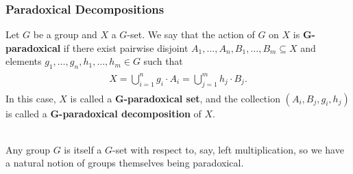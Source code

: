 \documentclass{beamer}
\theoremstyle{example}
\begin{document}
\begin{frame}
\frametitle{Paradoxical Decompositions}
\begin{definition}
Let $G$ be a group and $X$ a $G$-set. We say that the action of $G$ on $X$ is \textbf{$\boldsymbol{G}$-paradoxical} if there exist pairwise disjoint $A_1, \dots, A_n, B_1, \dots, B_m \subseteq X$ and elements $g_1, \dots, g_n, h_1, \dots, h_m \in G$ such that\\[-1.5\baselineskip]
\begin{align*}
\begin{split}
X = \bigcup_{i=1}^n g_i \cdot A_i = \bigcup_{j=1}^m h_j \cdot B_j.
\end{split}
\end{align*}
In this case, $X$ is called a \textbf{$\boldsymbol{G}$-paradoxical set}, and the collection $(A_i, B_j, g_i, h_j)$ is called a \textbf{$\boldsymbol{G}$-paradoxical decomposition} of $X$.
\end{definition}

\noindent\\[0.5\baselineskip] Any group $G$ is itself a $G$-set with respect to, say, left multiplication, so we have a natural notion of groups themselves being paradoxical.\\[\baselineskip]


\end{frame}

\end{document}
